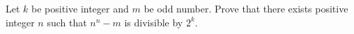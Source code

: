 Let $ k$ be positive integer and $ m$ be odd number. Prove that there exists positive integer $ n$ such that $ n^n - m$ is divisible by $ 2^k$.